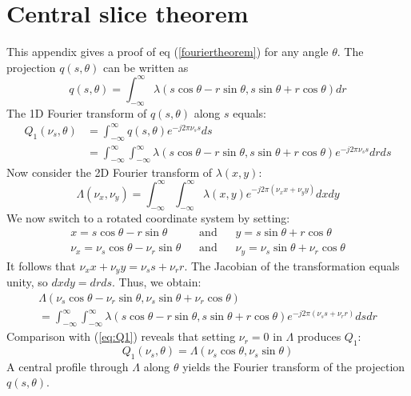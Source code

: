 \section{Central slice theorem} \label{app:cs}
This appendix gives a proof of eq (\ref{fouriertheorem}) for any angle
$\theta$. The projection $q(s,\theta)$ can be written as
\begin{equation}
  q(s, \theta) = \int_{-\infty}^{\infty} \lambda(s \cos\theta - r\sin\theta, 
                                s \sin\theta + r\cos\theta) dr
\end{equation}
The 1D Fourier transform of $q(s,\theta)$ along $s$ equals:
\begin{align}
  Q_1(\nu_s, \theta) &= \int_{-\infty}^{\infty} q(s, \theta) e^{-j2\pi \nu_s s} ds \nonumber \\
  &= \int_{-\infty}^{\infty}\int_{-\infty}^{\infty}\lambda(s\cos\theta - r\sin\theta, 
                          s\sin\theta + r\cos\theta)e^{-j2\pi \nu_s s} dr ds
      \label{eq:Q1}
\end{align}
Now consider the 2D Fourier transform of $\lambda(x,y)$:
\begin{equation}
  \Lambda(\nu_x, \nu_y) = \int_{-\infty}^{\infty} \int_{-\infty}^{\infty} \lambda(x,y) 
       e^{-j2\pi (\nu_x x + \nu_y y)} dx dy
\end{equation}
We now switch to a rotated coordinate system by setting:
\begin{align}
   x = s \cos\theta - r\sin\theta \;\;\;&\mbox{and}& \;\;\;
   y = s\sin\theta + r\cos\theta\\
   \nu_x = \nu_s \cos\theta - \nu_r\sin\theta \;\;\;&\mbox{and}& \;\;\;
   \nu_y = \nu_s\sin\theta + \nu_r\cos\theta
\end{align}
It follows that $\nu_x x + \nu_y y = \nu_s s + \nu_r r$. The Jacobian
of the transformation equals unity, so $dx dy = dr ds$. Thus, we obtain:
\begin{multline}
\Lambda(\nu_s \cos\theta - \nu_r\sin\theta, 
      \nu_s\sin\theta + \nu_r\cos\theta) \\
   = \int_{-\infty}^{\infty} \int_{-\infty}^{\infty} 
     \lambda(s \cos\theta - r\sin\theta, s\sin\theta + r\cos\theta) 
       e^{-j2\pi (\nu_s s + \nu_r r)} ds dr
\end{multline}
Comparison with (\ref{eq:Q1}) reveals that setting $\nu_r = 0$ in
$\Lambda$ produces $Q_1$:
\begin{equation}
  Q_1(\nu_s, \theta) = \Lambda(\nu_s\cos\theta, \nu_s\sin\theta )
\end{equation}
A central profile through $\Lambda$ along $\theta$ yields the Fourier
transform of the projection $q(s,\theta)$.

